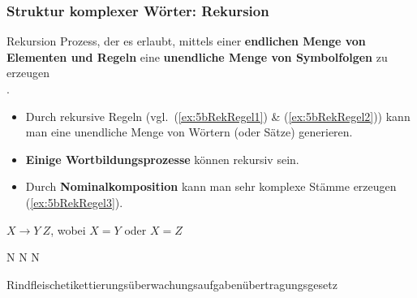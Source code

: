 \begin{frame}
\frametitle{Struktur komplexer Wörter: Rekursion}


\begin{block}{Rekursion}
	Prozess, der es erlaubt, mittels einer \textbf{endlichen Menge von Elementen und Regeln} eine \textbf{unendliche Menge von Symbolfolgen} zu erzeugen\\
	\hfill  \citep[vgl.][]{Hetland14a, Olsen15a}. 
\end{block}

\begin{itemize}
	\item Durch rekursive Regeln (vgl.\ (\ref{ex:5bRekRegel1}) \& (\ref{ex:5bRekRegel2})) kann man eine unendliche Menge von Wörtern (oder Sätze) generieren.

	\item \textbf{Einige Wortbildungsprozesse} können rekursiv sein.
		
	\item Durch \textbf{Nominalkomposition} kann man sehr komplexe Stämme erzeugen (\ref{ex:5bRekRegel3}).
	
\end{itemize}

\settowidth{} 
\ea 
	\ea\label{ex:5bRekRegel1} $X \rightarrow Y~Z$, wobei $X = Y$ oder $X = Z$ 
	
	\ex\label{ex:5bRekRegel2} N \ras N N 
		
	\ex\label{ex:5bRekRegel3} Rindfleischetikettierungsüberwachungsaufgabenübertragungsgesetz
	
	\z 
\z 
\end{frame}


